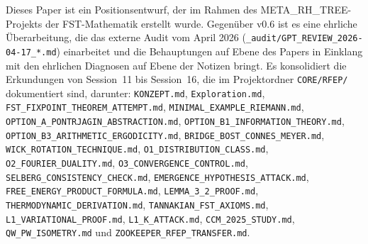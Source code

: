 \documentclass[11pt,a4paper]{article}
\theoremstyle{plain}
\theoremstyle{definition}
\begin{document}
Dieses Paper ist ein Positionsentwurf, der im Rahmen des META\_RH\_TREE-Projekts
der FST-Mathematik erstellt wurde. Gegenüber v0.6 ist es eine ehrliche Überarbeitung,
die das externe Audit vom April 2026 (\texttt{\_audit/GPT\_REVIEW\_2026-04-17\_*.md})
einarbeitet und die Behauptungen auf Ebene des Papers in Einklang mit den
ehrlichen Diagnosen auf Ebene der Notizen bringt.
Es konsolidiert die Erkundungen von Session~11 bis Session~16, die im Projektordner
\texttt{CORE/RFEP/} dokumentiert sind, darunter:
\texttt{KONZEPT.md},
\texttt{Exploration.md},
\texttt{FST\_FIXPOINT\_THEOREM\_ATTEMPT.md},
\texttt{MINIMAL\_EXAMPLE\_RIEMANN.md},
\texttt{OPTION\_A\_PONTRJAGIN\_ABSTRACTION.md},
\texttt{OPTION\_B1\_INFORMATION\_THEORY.md},
\texttt{OPTION\_B3\_ARITHMETIC\_ERGODICITY.md},
\texttt{BRIDGE\_BOST\_CONNES\_MEYER.md},
\texttt{WICK\_ROTATION\_TECHNIQUE.md},
\texttt{O1\_DISTRIBUTION\_CLASS.md},
\texttt{O2\_FOURIER\_DUALITY.md},
\texttt{O3\_CONVERGENCE\_CONTROL.md},
\texttt{SELBERG\_CONSISTENCY\_CHECK.md},
\texttt{EMERGENCE\_HYPOTHESIS\_ATTACK.md},
\texttt{FREE\_ENERGY\_PRODUCT\_FORMULA.md},
\texttt{LEMMA\_3\_2\_PROOF.md},
\texttt{THERMODYNAMIC\_DERIVATION.md},
\texttt{TANNAKIAN\_FST\_AXIOMS.md},
\texttt{L1\_VARIATIONAL\_PROOF.md},
\texttt{L1\_K\_ATTACK.md},
\texttt{CCM\_2025\_STUDY.md},
\texttt{QW\_PW\_ISOMETRY.md} und
\texttt{ZOOKEEPER\_RFEP\_TRANSFER.md}.
\end{document}
